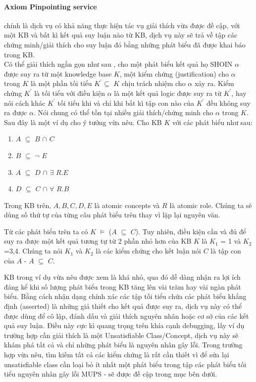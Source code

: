 \paragraph{Axiom Pinpointing service} chính là dịch vụ có khả năng thực hiện tác vụ giải thích vừa được đề cập, với một KB và bất kì kết quả suy luận nào từ KB, dịch vụ này sẽ trả về tập các chứng minh/giải thích cho suy luận đó bằng những phát biểu đã được khai báo trong KB.
\\
\hspace*{0.05\textwidth} Có thể giải thích ngắn gọn như sau \cite[p.~2]{axiomPinpoint}, cho một phát biểu kết quả họ SHOIN $\alpha$ được suy ra từ một knowledge base $K$, một kiểm chứng (justification) cho $\alpha$  trong $K$ là một phần tối tiểu $K^{'}\subseteq$ $K$ chịu trách nhiệm cho $\alpha$ xảy ra. Kiểm chứng $K^{'}$ là tối tiểu với điều kiện $\alpha$ là một kết quả logic được suy ra từ $K^{'}$, hay nói cách khác $K^{'}$ tối tiểu khi và chỉ khi bất kì tập con nào của $K^{'}$ đều không suy ra được $\alpha$. Nói chung có thể tồn tại nhiều giải thích/chứng minh cho $\alpha$ trong $K$. Sau đây là một ví dụ cho ý tưởng vừa nêu. Cho KB $K$ với các phát biểu như sau:
\begin{enumerate}
	\item	$A$ $\subseteq$ $B$ $\cap$ $C$ 
	\item	$B$ $\subseteq$ $\neg$ $E$
	\item	$A$ $\subseteq$ $D$ $\cap$ $\exists$ $R.E$ 
	\item	$D$ $\subseteq$ $C$ $\cap$ $\forall$ $R.B$
\end{enumerate}
		
Trong KB trên, $A, B, C, D, E$ là atomic concepts và $R$ là atomic role.  Chúng ta sẽ dùng số thứ tự của từng câu phát biểu trên thay vì lặp lại nguyên văn.
 
\hspace*{0.05\textwidth} Từ các phát biểu trên ta có $K$ $\models$ ($A$ $\subseteq$ $C$). Tuy nhiên, điều kiện cần và đủ để suy ra được một kết quả tương tự từ 2 phần nhỏ hơn của KB $K$ là $K_{1}$ = {1} và $K_{2}$ ={3,4}. Chúng ta nói $K_{1}$ và $K_{2}$ là các kiểm chứng cho kết luận nói $C$ là tập con của $A$ - $A$ $\subseteq$ $C$.

\hspace*{0.05\textwidth} KB trong ví dụ vừa nêu được xem là khá nhỏ, qua đó dễ dàng nhận ra lợi ích đáng kể khi số lượng phát biểu trong KB tăng lên vài trăm hay vài ngàn phát biểu. Bằng cách nhận dạng chính xác các tập tối tiểu chứa các phát biểu khẳng định (asserted) là những giả thiết cho kết quả được suy ra, dịch vụ này có thể được dùng để cô lập, đánh dấu và giải thích nguyên nhân hoặc cơ sở của các kết quả suy luận. Điều này cực kì quang trọng trên khía cạnh debugging, lấy ví dụ trường hợp cần giải thích là một Unsatisfiable Class/Concept, dịch vụ này sẽ khám phá tất cả và chỉ những phát biểu là nguyên nhân gây lỗi. Trong trường hợp vừa nêu, tìm kiếm tất cả các kiểm chứng là rất cần thiết vì để sửa lại unsatisfiable class cần loại bỏ ít nhất một phát biểu trong tập các phát biểu tối tiểu nguyên nhân gây lỗi MUPS - sẽ được đề cập trong mục bên dưới.

